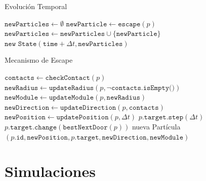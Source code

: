 \documentclass[aspectratio=169]{beamer}
\begin{document}
\begin{frame}{Evolución Temporal}
    \begin{algorithm}[H]
        \begin{algorithmic}[1]
            \State $\texttt{newParticles} \leftarrow \emptyset$
                \State $\texttt{newParticle} \leftarrow \texttt{escape}(p)$
                    \State $\texttt{newParticles} \leftarrow \texttt{newParticles} \cup \{\texttt{newParticle}\}$
                \EndIf
            \EndFor
            \State \Return $\texttt{new State}(\texttt{time} + \Delta t, \texttt{newParticles})$
        \end{algorithmic}
    \end{algorithm}
\end{frame}

\begin{frame}{Mecanismo de Escape}
    \begin{algorithm}[H]
        \begin{algorithmic}[1]
                \State $\texttt{contacts} \leftarrow \texttt{checkContact}(p)$
                \State $\texttt{newRadius} \leftarrow \texttt{updateRadius}(p, \neg \texttt{contacts.isEmpty()})$
                \State $\texttt{newModule} \leftarrow \texttt{updateModule}(p, \texttt{newRadius})$
                \State $\texttt{newDirection} \leftarrow \texttt{updateDirection}(p, \texttt{contacts})$
                \State $\texttt{newPosition} \leftarrow \texttt{updatePosition}(p, \Delta t)$
                \State $p.\texttt{target.step}(\Delta t)$
                    \State $p.\texttt{target.change}(\texttt{bestNextDoor}(p))$
                \EndIf
                \State \Return nueva Partícula$(p.\texttt{id}, \texttt{newPosition}, p.\texttt{target}, \texttt{newDirection}, \texttt{newModule})$
            \EndFunction
        \end{algorithmic}
    \end{algorithm}
\end{frame}

\section{Simulaciones}
\end{document}
